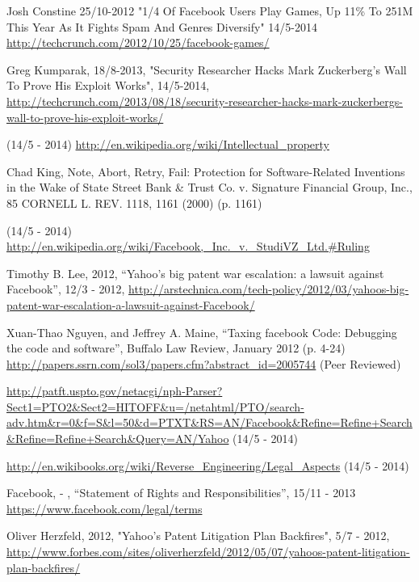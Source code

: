 \documentclass[conference]{IEEEtran}
\begin{document}
\begin{thebibliography}{1}
Josh Constine
25/10-2012
"1/4 Of Facebook Users Play Games, Up 11\% To 251M This Year As It Fights Spam And Genres Diversify"
14/5-2014
\href{http://techcrunch.com/2012/10/25/facebook-games/}{http://techcrunch.com/2012/10/25/facebook-games/}

Greg Kumparak,
18/8-2013,
"Security Researcher Hacks Mark Zuckerberg’s Wall To Prove His Exploit Works",
14/5-2014,
\href{http://techcrunch.com/2013/08/18/security-researcher-hacks-mark-zuckerbergs-wall-to-prove-his-exploit-works/}{http://techcrunch.com/2013/08/18/security-researcher-hacks-mark-zuckerbergs-wall-to-prove-his-exploit-works/}

 (14/5 - 2014)
\url{http://en.wikipedia.org/wiki/Intellectual\_property}

Chad King, Note, Abort, Retry, Fail: Protection for Software-Related Inventions in the Wake of State Street Bank \& Trust Co. v. Signature Financial Group, Inc., 85 CORNELL L. REV. 1118, 1161 (2000) (p. 1161)

(14/5 - 2014)
\url{http://en.wikipedia.org/wiki/Facebook,\_Inc.\_v.\_StudiVZ\_Ltd.#Ruling}  

Timothy B. Lee,  2012, “Yahoo’s big patent war escalation: a lawsuit against Facebook”, 12/3 - 2012,
\url{http://arstechnica.com/tech-policy/2012/03/yahoos-big-patent-war-escalation-a-lawsuit-against-Facebook/}

Xuan-Thao Nguyen, and Jeffrey A. Maine, “Taxing facebook Code: Debugging the
code and software”, Buffalo Law Review, January 2012 (p. 4-24)
\url{http://papers.ssrn.com/sol3/papers.cfm?abstract\_id=2005744} (Peer Reviewed)

\url{http://patft.uspto.gov/netacgi/nph-Parser?Sect1=PTO2\&Sect2=HITOFF\&u=/netahtml/PTO/search-adv.htm\&r=0\&f=S\&l=50\&d=PTXT\&RS=AN/Facebook\&Refine=Refine+Search\&Refine=Refine+Search\&Query=AN/Yahoo} (14/5 - 2014)

\url{http://en.wikibooks.org/wiki/Reverse\_Engineering/Legal\_Aspects} (14/5 - 2014)

Facebook, - , “Statement of Rights and Responsibilities”, 15/11 - 2013
\url{https://www.facebook.com/legal/terms}

Oliver Herzfeld, 2012, "Yahoo's Patent Litigation Plan Backfires", 5/7 - 2012, \url{http://www.forbes.com/sites/oliverherzfeld/2012/05/07/yahoos-patent-litigation-plan-backfires/}


\end{thebibliography}
\end{document}

